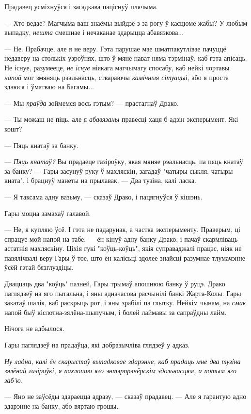 Прадавец усміхнуўся і загадкава паціснуў плячыма.

--- Хто ведае? Магчыма ваш знаёмы выйдзе з-за рогу ў касцюме жабы?
У любым выпадку, \emph{нешта} смешнае і нечаканае здарыцца абавязкова...

--- Не. Прабачце, але я не веру. Гэта парушае мае шматпакутлівае пачуццё недаверу на
столькіх узроўнях, што ў мяне нават няма тэрмінаў, каб гэта апісаць.
Не існуе, разумееце, \emph{не існуе} ніякага магчымагу спосабу, каб нейкі
чортавы \emph{напой} мог змяняць рэальнасць, ствараючы \emph{камічныя сітуацыі}, 
або я проста здаюся і ўматваю на Багамы...

--- Мы \emph{праўда} зоймемся вось гэтым? --- прастагнаў Драко.

--- Ты можаш не піць, але я \emph{абавязаны} правесці хаця б адзін эксперымент. 
Які кошт?

--- Пяць кнатаў за банку.

--- \emph{Пяць кнатаў?} Вы прадаеце газіроўку, якая мяняе рэальнасць, па пяць кнатаў
за банку? --- Гары засунуў руку ў махляскін, загадаў "чатыры сыкля, чатыры кната",
і брацнуў манеты на прылавак. --- Два тузіна, калі ласка.

--- Я таксама адну вазьму, --- сказаў Драко, і пацягнуўся ў кішэнь.

Гары моцна замахаў галавой. 

--- Не, я купляю ўсё. І гэта не падарунак, а частка эксперыменту. Праверым, ці
спрацуе мой напой на табе, --- ён кінуў адну банку Драко, і пачаў скармліваць астатнія
махляскіну. Ціхія гукі "коўць-коўць", якія суправаджалі працэс, ніяк не павялічвалі
веру Гары ў тое, што ён калісьці здолее знайсці разумнае тлумачэнне ўсёй гэтай
бязглуздіцы. 

Дваццаць два "коўць" пазней, Гары трымаў апошнюю банку ў руцэ. Драко паглядзеў на
яго пытальна, і яны адначасова расчынілі банкі Жарта-Колы. Гары закатаў шалік, 
каб раскрыць рот, і яны зрабілі па глытку. Нейкім чынам, на \emph{смак} напой быў
кіслотна-зялёна-шыпучым, і болей лаймавы за сапраўдны лайм.

Нічога не адбылося.

Гары паглядзеў на прадаўца, які добразычліва глядзеў у адказ.


\emph{Ну ладна, калі ён скарыстаў выпадковае здарэнне, каб прадаць мне два тузіна 
зялёнай газіроўкі, я пахлопаю яго энтэрпрэнёрскім здольнасцям, а потым яго заб'ю.}

--- Яно не заўсёды здараецца адразу, --- сказаў прадавец. --- Але я гарантую адно 
здарэнне на банку, або вяртаю грошы.

